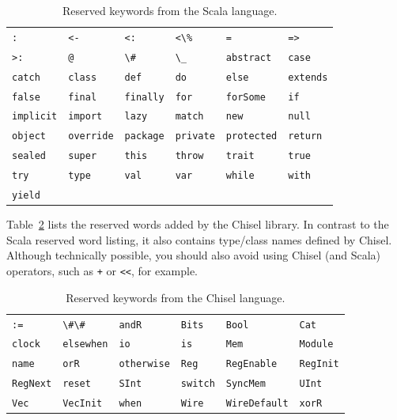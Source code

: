 \documentclass[%
    10pt,
    headinclude, footinclude=false,
    openright, %
    notitlepage,
    cleardoublepage=empty,
    headsepline,
    numbers=noenddot,
    bibliography=totoc, index=totoc,
    ]{scrbook}
\newcommand{\code}[1]{{\lstinline[basicstyle=\small\ttfamily]{#1}}}
\begin{document}
\begin{table}[h]
\centering
\begin{tabular}{llllll}
\code{:}  & \code{<-}  & \code{<:}  & \code{<\%}  & \code{=}  & \code{=>} \\
\code{>:}  & \code{@}  & \code{\#}  & \code{\_}  & \code{abstract}  & \code{case} \\
\code{catch}  & \code{class}  & \code{def}  & \code{do}  & \code{else}  & \code{extends} \\
\code{false}  & \code{final}  & \code{finally}  & \code{for}  & \code{forSome}  & \code{if} \\
\code{implicit}  & \code{import}  & \code{lazy}  & \code{match}  & \code{new}  & \code{null} \\
\code{object}  & \code{override}  & \code{package}  & \code{private}  & \code{protected}  & \code{return} \\
\code{sealed}  & \code{super}  & \code{this}  & \code{throw}  & \code{trait}  & \code{true} \\
\code{try}  & \code{type}  & \code{val}  & \code{var}  & \code{while}  & \code{with} \\
\code{yield}  & \\
\end{tabular}
\caption{Reserved keywords from the Scala language.}
\label{tab:reserved:scala}
\end{table}

Table~\ref{tab:reserved:chisel} lists the reserved words added by the Chisel library.
In contrast to the Scala reserved word listing, it also contains type/class names defined by Chisel.
Although technically possible, you should also avoid using Chisel (and Scala) operators, such as
\code{+} or \code{<<}, for example. %

\begin{table}[h]
\centering
\begin{tabular}{llllll}
\code{:=}  & \code{\#\#}  & \code{andR}  & \code{Bits}  & \code{Bool}  & \code{Cat} \\
\code{clock}  & \code{elsewhen}  & \code{io}  & \code{is}  & \code{Mem}  & \code{Module} \\
\code{name}  & \code{orR}  & \code{otherwise}  & \code{Reg}  & \code{RegEnable}  & \code{RegInit} \\
\code{RegNext}  & \code{reset}  & \code{SInt}  & \code{switch}  & \code{SyncMem}  & \code{UInt} \\
\code{Vec}  & \code{VecInit}  & \code{when}  & \code{Wire}  & \code{WireDefault}  & \code{xorR} \\
\end{tabular}
\caption{Reserved keywords from the Chisel language.}
\label{tab:reserved:chisel}
\end{table}
\end{document}
